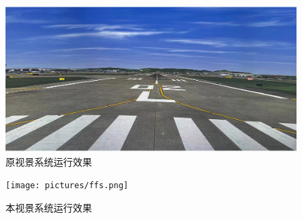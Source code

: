 \begin{figure}[h!]
    \begin{center}
        \includegraphics[width=.8\textwidth]{pictures/ffs2.png}
        \caption{原视景系统运行效果}
        \label{flightffs}
    \end{center}
\end{figure}
\begin{figure}[h!]
    \begin{center}
        \texttt{[image: pictures/ffs.png]}
        \caption{本视景系统运行效果}
        \label{flighttest}
    \end{center}
\end{figure}

